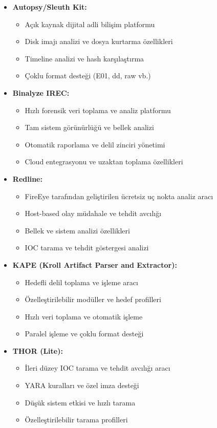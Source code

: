 \begin{itemize}
\begin{itemize}
    \item \textbf{Autopsy/Sleuth Kit:}
    \begin{itemize}
        \item Açık kaynak dijital adli bilişim platformu
        \item Disk imajı analizi ve dosya kurtarma özellikleri
        \item Timeline analizi ve hash karşılaştırma
        \item Çoklu format desteği (E01, dd, raw vb.)
    \end{itemize}

    \item \textbf{Binalyze IREC:}
    \begin{itemize}
        \item Hızlı forensik veri toplama ve analiz platformu
        \item Tam sistem görünürlüğü ve bellek analizi
        \item Otomatik raporlama ve delil zinciri yönetimi
        \item Cloud entegrasyonu ve uzaktan toplama özellikleri
    \end{itemize}

    \item \textbf{Redline:}
    \begin{itemize}
        \item FireEye tarafından geliştirilen ücretsiz uç nokta analiz aracı
        \item Host-based olay müdahale ve tehdit avcılığı
        \item Bellek ve sistem analizi özellikleri
        \item IOC tarama ve tehdit göstergesi analizi
    \end{itemize}

    \item \textbf{KAPE (Kroll Artifact Parser and Extractor):}
    \begin{itemize}
        \item Hedefli delil toplama ve işleme aracı
        \item Özelleştirilebilir modüller ve hedef profilleri
        \item Hızlı veri toplama ve otomatik işleme
        \item Paralel işleme ve çoklu format desteği
    \end{itemize}

    \item \textbf{THOR (Lite):}
    \begin{itemize}
        \item İleri düzey IOC tarama ve tehdit avcılığı aracı
        \item YARA kuralları ve özel imza desteği
        \item Düşük sistem etkisi ve hızlı tarama
        \item Özelleştirilebilir tarama profilleri
    \end{itemize}
\end{itemize}


\end{itemize}
